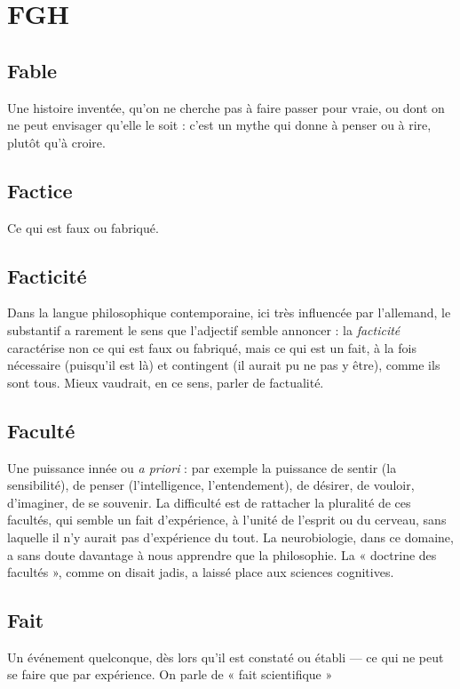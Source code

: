
\chapter{FGH}
\section{Fable}
Une histoire inventée, qu’on ne cherche pas à faire passer pour vraie,
ou dont on ne peut envisager qu’elle le soit : c’est un mythe qui
donne à penser ou à rire, plutôt qu’à croire.

\section{Factice}
Ce qui est faux ou fabriqué.

\section{Facticité}
Dans la langue philosophique contemporaine, ici très influencée
par l’allemand, le substantif a rarement le sens que l’adjectif
semble annoncer : la {\it facticité} caractérise non ce qui est faux ou fabriqué, mais ce
qui est un fait, à la fois nécessaire (puisqu'il est là) et contingent (il aurait pu ne
pas y être), comme ils sont tous. Mieux vaudrait, en ce sens, parler de factualité.

\section{Faculté}
Une puissance innée ou {\it a priori} : par exemple la puissance de
sentir (la sensibilité), de penser (l'intelligence, l’entendement), de
désirer, de vouloir, d'imaginer, de se souvenir. La difficulté est de rattacher la pluralité
de ces facultés, qui semble un fait d'expérience, à l’unité de l'esprit ou du cerveau,
sans laquelle il n’y aurait pas d’expérience du tout. La neurobiologie, dans ce
domaine, a sans doute davantage à nous apprendre que la philosophie. La « doctrine
des facultés », comme on disait jadis, a laissé place aux sciences cognitives.

\section{Fait}
Un événement quelconque, dès lors qu’il est constaté ou établi — ce
qui ne peut se faire que par expérience. On parle de « fait scientifique »

